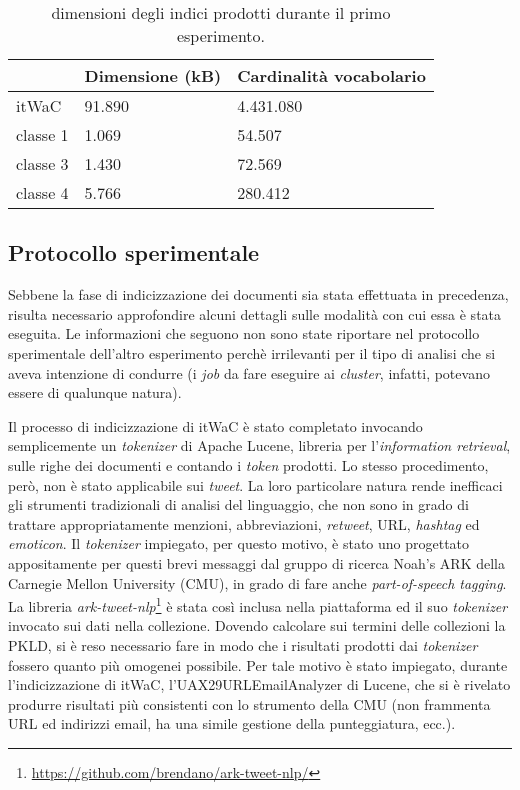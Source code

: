 \begin{table}[ht]
\centering
\begin{tabular}{l|l|l|}
\cline{2-3}
                               & Dimensione (kB)   & Cardinalità vocabolario \\ \hline
\multicolumn{1}{|l|}{itWaC}    & 91.890            & 4.431.080  \\
\multicolumn{1}{|l|}{classe 1} & 1.069             & 54.507      \\
\multicolumn{1}{|l|}{classe 3} & 1.430             & 72.569      \\
\multicolumn{1}{|l|}{classe 4} & 5.766             & 280.412     \\ \hline
\end{tabular}
\caption{dimensioni degli indici prodotti durante il primo esperimento.}
\label{indexsize}
\end{table}

\subsection{Protocollo sperimentale}
\label{esptweet:proto}

Sebbene la fase di indicizzazione dei documenti sia stata effettuata in precedenza, risulta necessario approfondire alcuni dettagli sulle modalità con cui essa è stata eseguita.
Le informazioni che seguono non sono state riportare nel protocollo sperimentale dell'altro esperimento perchè irrilevanti per il tipo di analisi che si aveva intenzione di condurre
(i \textit{job} da fare eseguire ai \textit{cluster}, infatti, potevano essere di qualunque natura).

Il processo di indicizzazione di itWaC è stato completato invocando semplicemente un \textit{tokenizer} di Apache Lucene, libreria per l’\textit{information retrieval},
sulle righe dei documenti e contando i \textit{token} prodotti.
Lo stesso procedimento, però, non è stato applicabile sui \textit{tweet}. La loro particolare natura rende inefficaci gli strumenti tradizionali di analisi del linguaggio, che non sono
in grado di trattare appropriatamente menzioni, abbreviazioni, \textit{retweet}, URL, \textit{hashtag} ed \textit{emoticon}. Il \textit{tokenizer} impiegato, per questo motivo, è stato uno 
progettato appositamente per questi brevi messaggi dal gruppo di ricerca Noah’s ARK della Carnegie Mellon University (CMU), in grado di fare anche \textit{part-of-speech tagging}.
La libreria \textit{ark-tweet-nlp}\footnote{\url{https://github.com/brendano/ark-tweet-nlp/}} è stata così inclusa nella piattaforma ed il suo \textit{tokenizer} invocato sui dati nella collezione.
Dovendo calcolare sui termini delle collezioni la PKLD, si è reso necessario fare in modo che i risultati prodotti dai \textit{tokenizer} fossero quanto più omogenei possibile.
Per tale motivo è stato impiegato, durante l'indicizzazione di itWaC, l'UAX29URLEmailAnalyzer di Lucene, che si è rivelato produrre risultati più consistenti con lo strumento della CMU
(non frammenta URL ed indirizzi email, ha una simile gestione della punteggiatura, ecc.).

